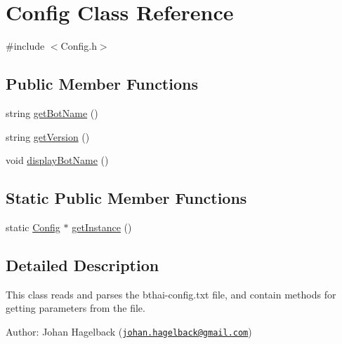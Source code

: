\hypertarget{class_config}{\section{Config Class Reference}
\label{class_config}
}


{\ttfamily \#include $<$Config.\-h$>$}

\subsection*{Public Member Functions}
\begin{DoxyCompactItemize}
\item 
string \hyperlink{class_config_a23b348779bcc6f1994204390b3e5624d}{get\-Bot\-Name} ()
\item 
string \hyperlink{class_config_aa1dda4f7194edcec4daf5b42026cbe50}{get\-Version} ()
\item 
void \hyperlink{class_config_a57ab90ea3202cc596b472b69d70f09e9}{display\-Bot\-Name} ()
\end{DoxyCompactItemize}
\subsection*{Static Public Member Functions}
\begin{DoxyCompactItemize}
\item 
static \hyperlink{class_config}{Config} $\ast$ \hyperlink{class_config_af7d6f89fc34627f15523df0b62acd7e5}{get\-Instance} ()
\end{DoxyCompactItemize}


\subsection{Detailed Description}
This class reads and parses the bthai-\/config.\-txt file, and contain methods for getting parameters from the file.

Author\-: Johan Hagelback (\href{mailto:johan.hagelback@gmail.com}{\tt johan.\-hagelback@gmail.\-com}) 

